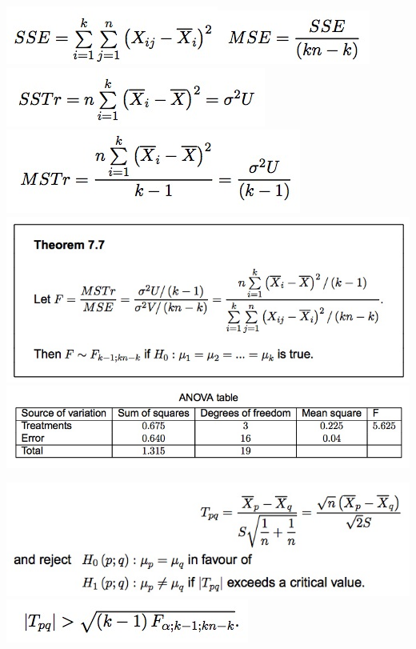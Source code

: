 \documentclass{examnotes}
\begin{document}
\includegraphics[scale=0.5]{./img/sse.jpg}\includegraphics[scale=0.5]{./img/mse.jpg}
\includegraphics[scale=0.5]{./img/sstr.jpg}\includegraphics[scale=0.5]{./img/mstr.jpg}
\includegraphics[scale=0.5]{./img/annovaf.jpg}
\includegraphics[scale=0.5]{./img/anova.jpg}

\includegraphics[scale=0.5]{./img/muc.jpg}
\includegraphics[scale=0.5]{./img/muc2.jpg}
\end{document}

